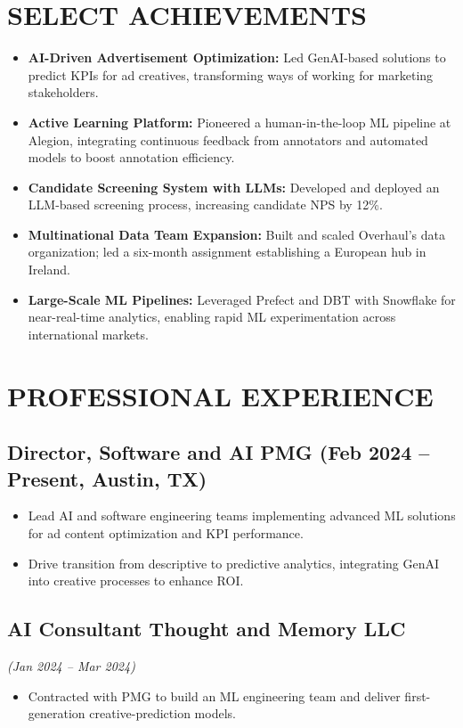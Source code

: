 \documentclass[11pt]{article}
\begin{document}
\section*{SELECT ACHIEVEMENTS}
\begin{itemize}[leftmargin=*]
  \item \textbf{AI-Driven Advertisement Optimization:} Led GenAI-based solutions to predict KPIs for ad creatives, transforming ways of working for marketing stakeholders.
  \item \textbf{Active Learning Platform:} Pioneered a human-in-the-loop ML pipeline at Alegion, integrating continuous feedback from annotators and automated models to boost annotation efficiency.
  \item \textbf{Candidate Screening System with LLMs:} Developed and deployed an LLM-based screening process, increasing candidate NPS by 12\%.
  \item \textbf{Multinational Data Team Expansion:} Built and scaled Overhaul's data organization; led a six-month assignment establishing a European hub in Ireland.
  \item \textbf{Large-Scale ML Pipelines:} Leveraged Prefect and DBT with Snowflake for near-real-time analytics, enabling rapid ML experimentation across international markets.
\end{itemize}

\section*{PROFESSIONAL EXPERIENCE}

\subsection*{Director, Software and AI \hfill PMG (Feb 2024 -- Present, Austin, TX)}
\begin{itemize}[leftmargin=*]
  \item Lead AI and software engineering teams implementing advanced ML solutions for ad content optimization and KPI performance.
  \item Drive transition from descriptive to predictive analytics, integrating GenAI into creative processes to enhance ROI.
\end{itemize}

\subsection*{AI Consultant \hfill Thought and Memory LLC}
\textit{(Jan 2024 -- Mar 2024)}
\begin{itemize}[leftmargin=*]
  \item Contracted with PMG to build an ML engineering team and deliver first-generation creative-prediction models.
\end{itemize}
\end{document}
